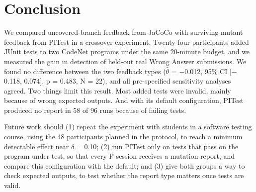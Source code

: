 \section{Conclusion}
\label{sec:conclusion}

We compared uncovered-branch feedback from JaCoCo with surviving-mutant feedback from PITest in a crossover experiment. Twenty-four participants added JUnit tests to two CodeNet programs under the same 20-minute budget, and we measured the gain in detection of held-out real Wrong Answer submissions.
We found no difference between the two feedback types ($\hat{\theta}$ = $-$0.012, 95\% CI [$-$0.118, 0.074], p = 0.483, N = 22), and all pre-specified sensitivity analyses agreed.
Two things limit this result. Most added tests were invalid, mainly because of wrong expected outputs. And with its default configuration, PITest produced no report in 58 of 96 runs because of failing tests.

Future work should (1) repeat the experiment with students in a software testing course, using the 48 participants planned in the protocol, to reach a minimum detectable effect near $\delta$ = 0.10; (2) run PITest only on tests that pass on the program under test, so that every P session receives a mutation report, and compare this configuration with the default; and (3) give both groups a way to check expected outputs, to test whether the report type matters once tests are valid.
